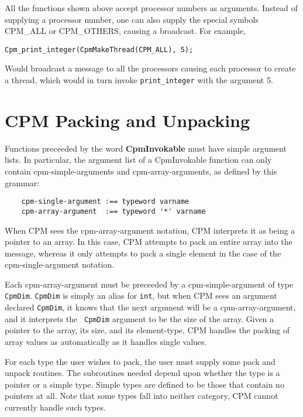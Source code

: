 All the functions shown above accept processor numbers as arguments.
Instead of supplying a processor number, one can also supply the
special symbols CPM\_ALL or CPM\_OTHERS, causing a broadcast.  For
example,

\begin{verbatim}
Cpm_print_integer(CpmMakeThread(CPM_ALL), 5);
\end{verbatim}

Would broadcast a message to all the processors causing each processor
to create a thread, which would in turn invoke {\tt print\_integer}
with the argument 5.

\section{CPM Packing and Unpacking}

Functions preceeded by the word {\bf CpmInvokable} must have simple
argument lists.  In particular, the argument list of a CpmInvokable
function can only contain cpm-simple-arguments and cpm-array-arguments,
as defined by this grammar:

\begin{verbatim}
    cpm-single-argument :== typeword varname
    cpm-array-argument  :== typeword '*' varname
\end{verbatim}

When CPM sees the cpm-array-argument notation, CPM interprets it as
being a pointer to an array.  In this case, CPM attempts to pack an
entire array into the message, whereas it only attempts to pack a
single element in the case of the cpm-single-argument notation.

Each cpm-array-argument must be preceeded by a cpm-simple-argument of
type {\tt CpmDim}.  {\tt CpmDim} is simply an alias for {\tt int}, but
when CPM sees an argument declared {\tt CpmDim}, it knows that the
next argument will be a cpm-array-argument, and it interprets the {\tt
CpmDim} argument to be the size of the array.  Given a pointer to the
array, its size, and its element-type, CPM handles the packing of
array values as automatically as it handles single values.

For each type the user wishes to pack, the user must supply some pack
and unpack routines.  The subroutines needed depend upon whether the
type is a pointer or a simple type.  Simple types are defined to be
those that contain no pointers at all.  Note that some types fall
into neither category, CPM cannot currently handle such types.

